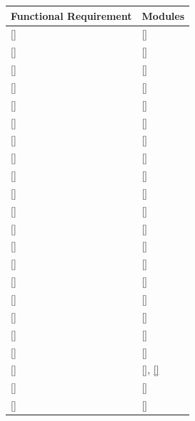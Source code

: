 \documentclass[12pt, titlepage]{article}
\newcommand{\descriptiveid}[1]{{\noexpandarg\StrSubstitute{#1}{_}{\textunderscore\allowbreak}[\idtmp]\texttt{\idtmp}}}
\newcommand{\idref}[1]{\hyperref[#1]{\descriptiveid{#1}}}
\newcommand{\srsurl}{https://ayushpatel2026.github.io/Keystone/SRS/SRS.pdf}
\newcommand{\srsref}[1]{\href{\srsurl\#nameddest=#1}{\descriptiveid{#1}}}
\begin{document}
\begin{longtable}{p{} p{}}

  \toprule
  Functional Requirement & Modules \\
  \midrule
  \srsref{FR_SupervisorProposal} & \idref{M_Projects} \\ \hline
  \srsref{FR_ProposalOptionalFields} & \idref{M_Projects} \\ \hline
  \srsref{FR_StudentProposal} & \idref{M_Projects} \\ \hline
  \srsref{FR_ReviewProposal} & \idref{M_Projects} \\ \hline
  \srsref{FR_ViewApprovedProjects} & \idref{M_Projects} \\ \hline
  \srsref{FR_ViewProjectStatus} & \idref{M_Projects} \\ \hline
  \srsref{FR_StudentProfile} & \idref{M_StudentsTeams} \\ \hline
  \srsref{FR_StudentTeams} & \idref{M_StudentsTeams} \\ \hline
  \srsref{FR_ValidateTeamRules} & \idref{M_StudentsTeams} \\ \hline
  \srsref{FR_TeamDiscovery} & \idref{M_StudentsTeams} \\ \hline
  \srsref{FR_TeamProfile} & \idref{M_StudentsTeams} \\ \hline
  \srsref{FR_TeamRecommend} & \idref{M_Recommendation} \\ \hline
  \srsref{FR_ProjectInterest} & \idref{M_Projects} \\ \hline
  \srsref{FR_DeclineTeam} & \idref{M_Projects} \\ \hline
  \srsref{FR_ProjectThreads} & \idref{M_Threads} \\ \hline
  \srsref{FR_ThreadsNotify} & \idref{M_Notifications} \\ \hline
  \srsref{FR_RequestApproval} & \idref{M_ApprovalWorkflow} \\ \hline
  \srsref{FR_ApprovalResponse} & \idref{M_ApprovalWorkflow} \\ \hline
  \srsref{FR_ExternalApproval} & \idref{M_ApprovalWorkflow} \\ \hline
  \srsref{FR_ApprovalPreflightValidate} & \idref{M_ApprovalWorkflow}, \idref{M_StudentsTeams} \\ \hline
  \srsref{FR_ApprovalRevision} & \idref{M_ApprovalWorkflow} \\ \hline
  \srsref{FR_DisableFeatures} & \idref{M_CourseManagement} \\ \hline

\end{longtable}
\end{document}
